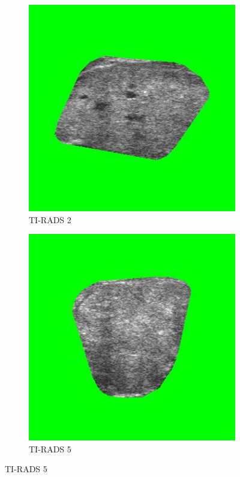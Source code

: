 \documentclass[12pt]{article}
\begin{document}
\begin{figure}[t]
\centering
\caption{Imagens utilizadas pelas Redes Neurais.}
\begin{subfigure}[p]{.45\textwidth}
  \centering
  \includegraphics[width=.85\linewidth]{images/t_2_green.jpg}
  \caption{TI-RADS 2}
  \label{fig:t2g}
\end{subfigure}
\hfill
\begin{subfigure}[p]{.45\textwidth}
  \centering
  \includegraphics[width=.85\linewidth]{images/t_5_green.jpg}
  \caption{TI-RADS 5}
  \label{fig:t5g}
\end{subfigure}
\label{fig:tgreen}
\end{figure}
\end{document}
